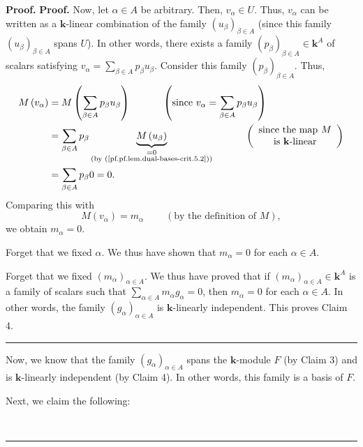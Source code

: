 \documentclass[numbers=enddot,12pt,final,onecolumn,notitlepage]{scrartcl}%
\theoremstyle{definition}
\newenvironment{proof}[1][Proof]{\noindent\textbf{#1.} }{\ \rule{0.5em}{0.5em}}
\let\sumnonlimits\sum
\renewcommand{\sum}{\sumnonlimits\limits}
\newenvironment{verlong}{}{}
\begin{document}
\begin{proof}
\begin{proof}
\begin{verlong}
Now, let $\alpha\in A$ be arbitrary. Then, $v_{\alpha}\in U$. Thus,
$v_{\alpha}$ can be written as a $\mathbf{k}$-linear combination of the family
$\left(  u_{\beta}\right)  _{\beta\in A}$ (since this family $\left(
u_{\beta}\right)  _{\beta\in A}$ spans $U$). In other words, there exists a
family $\left(  p_{\beta}\right)  _{\beta\in A}\in\mathbf{k}^{A}$ of scalars
satisfying $v_{\alpha}=\sum_{\beta\in A}p_{\beta}u_{\beta}$. Consider this
family $\left(  p_{\beta}\right)  _{\beta\in A}$. Thus,%
\begin{align*}
M\left(  v_{\alpha}\right)   &  =M\left(  \sum_{\beta\in A}p_{\beta}u_{\beta
}\right)  \ \ \ \ \ \ \ \ \ \ \left(  \text{since }v_{\alpha}=\sum_{\beta\in
A}p_{\beta}u_{\beta}\right) \\
&  =\sum_{\beta\in A}p_{\beta}\underbrace{M\left(  u_{\beta}\right)
}_{\substack{=0\\\text{(by (\ref{pf.pf.lem.dual-bases-crit.5.2}))}%
}}\ \ \ \ \ \ \ \ \ \ \left(
\begin{array}
[c]{c}%
\text{since the map }M\\
\text{is }\mathbf{k}\text{-linear}%
\end{array}
\right) \\
&  =\sum_{\beta\in A}p_{\beta}0=0.
\end{align*}
Comparing this with%
\[
M\left(  v_{\alpha}\right)  =m_{\alpha}\ \ \ \ \ \ \ \ \ \ \left(  \text{by
the definition of }M\right)  ,
\]
we obtain $m_{\alpha}=0$.
\end{verlong}

Forget that we fixed $\alpha$. We thus have shown that $m_{\alpha}=0$ for each
$\alpha\in A$.

Forget that we fixed $\left(  m_{\alpha}\right)  _{\alpha\in A}$. We thus have
proved that if $\left(  m_{\alpha}\right)  _{\alpha\in A}\in\mathbf{k}^{A}$ is
a family of scalars such that $\sum_{\alpha\in A}m_{\alpha}g_{\alpha}=0$, then
$m_{\alpha}=0$ for each $\alpha\in A$. In other words, the family $\left(
g_{\alpha}\right)  _{\alpha\in A}$ is $\mathbf{k}$-linearly independent. This
proves Claim 4.
\end{proof}

Now, we know that the family $\left(  g_{\alpha}\right)  _{\alpha\in A}$ spans
the $\mathbf{k}$-module $F$ (by Claim 3) and is $\mathbf{k}$-linearly
independent (by Claim 4). In other words, this family is a basis of $F$.

Next, we claim the following:


\end{proof}
\end{document}
